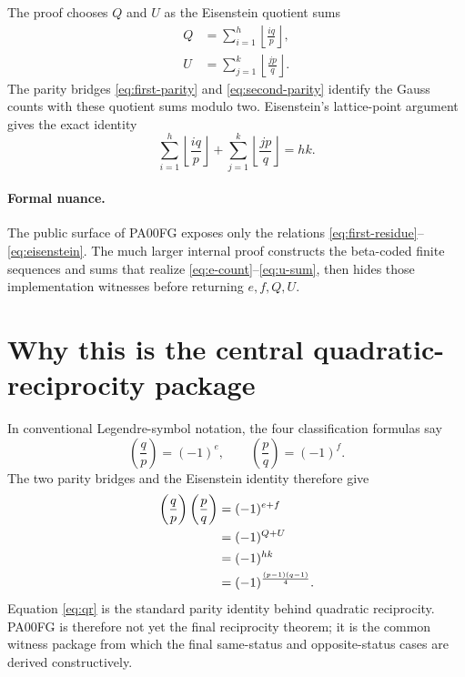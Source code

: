 \documentclass[11pt]{article}
\newcommand{\legendre}[2]{\left(\frac{#1}{#2}\right)}
\begin{document}
The proof chooses \(Q\) and \(U\) as the Eisenstein quotient sums
\begin{align}
  Q&=\sum_{i=1}^{h}\left\lfloor\frac{iq}{p}\right\rfloor,
  \label{eq:q-sum}\\
  U&=\sum_{j=1}^{k}\left\lfloor\frac{jp}{q}\right\rfloor.
  \label{eq:u-sum}
\end{align}
The parity bridges \eqref{eq:first-parity} and
\eqref{eq:second-parity} identify the Gauss counts with these quotient sums
modulo two.  Eisenstein's lattice-point argument gives the exact identity
\begin{equation}
  \sum_{i=1}^{h}\left\lfloor\frac{iq}{p}\right\rfloor
  +
  \sum_{j=1}^{k}\left\lfloor\frac{jp}{q}\right\rfloor
  =hk.
  \label{eq:lattice}
\end{equation}

\paragraph{Formal nuance.}
The public surface of PA00FG exposes only the relations
\eqref{eq:first-residue}--\eqref{eq:eisenstein}.  The much larger internal
proof constructs the beta-coded finite sequences and sums that realize
\eqref{eq:e-count}--\eqref{eq:u-sum}, then hides those implementation
witnesses before returning \(e,f,Q,U\).

\section{Why this is the central quadratic-reciprocity package}

In conventional Legendre-symbol notation, the four classification formulas
say
\begin{equation}
  \legendre{q}{p}=(-1)^e,
  \qquad
  \legendre{p}{q}=(-1)^f.
  \label{eq:gauss-signs}
\end{equation}
The two parity bridges and the Eisenstein identity therefore give
\begin{align}
  \legendre{q}{p}\legendre{p}{q}
    &=(-1)^{e+f}
      \notag\\
    &=(-1)^{Q+U}
      \notag\\
    &=(-1)^{hk}
      \notag\\
    &=(-1)^{\frac{(p-1)(q-1)}{4}}.
  \label{eq:qr}
\end{align}
Equation \eqref{eq:qr} is the standard parity identity behind quadratic
reciprocity.  PA00FG is therefore not yet the final reciprocity theorem; it is
the common witness package from which the final same-status and
opposite-status cases are derived constructively.
\end{document}
